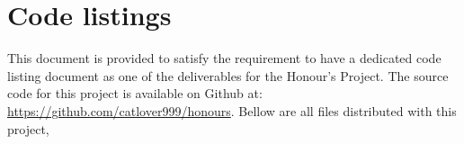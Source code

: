 
\chapter{Code listings}
This document is provided to satisfy the requirement to have a dedicated code listing document as one of the deliverables for the Honour's Project. The source code for this project is available on Github at: \url{https://github.com/catlover999/honours}. Bellow are all files distributed with this project, 









